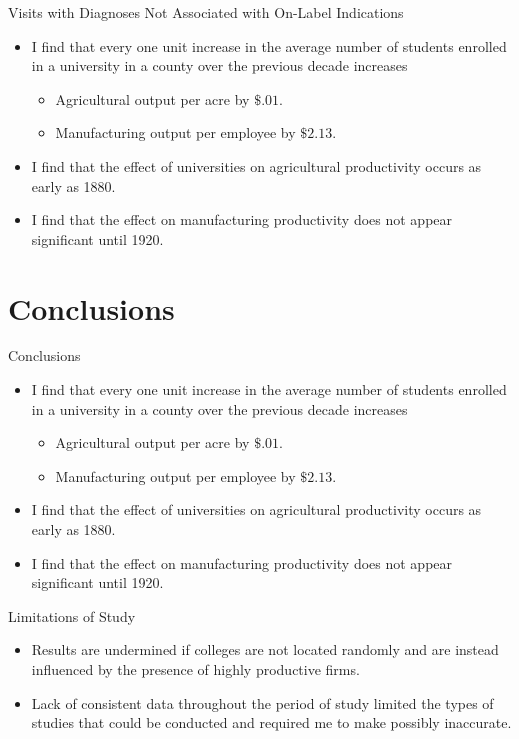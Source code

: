 \documentclass{beamer}
\begin{document}
\begin{frame}{Visits with Diagnoses Not Associated with On-Label Indications}
\begin{itemize}
\item I find that every one unit increase in the average number of students enrolled in a university in a county over the previous decade increases 
\begin{itemize}
\item Agricultural output per acre by $\$.01$. 
\item Manufacturing output per employee by $\$2.13$.
\end{itemize}
\item I find that the effect of universities on agricultural productivity occurs as early as 1880.
\item I find that the effect on manufacturing productivity does not appear significant until 1920.
\end{itemize}
\end{frame}

\section{Conclusions}
\begin{frame}{Conclusions}
\begin{itemize}
\item I find that every one unit increase in the average number of students enrolled in a university in a county over the previous decade increases 
\begin{itemize}
\item Agricultural output per acre by $\$.01$. 
\item Manufacturing output per employee by $\$2.13$.
\end{itemize}
\item I find that the effect of universities on agricultural productivity occurs as early as 1880.
\item I find that the effect on manufacturing productivity does not appear significant until 1920.
\end{itemize}
\end{frame}

\begin{frame}{Limitations of Study}
\begin{itemize}
\item Results are undermined if colleges are not located randomly and are instead influenced by the presence of highly productive firms.
\item Lack of consistent data throughout the period of study limited the types of studies that could be conducted and required me to make possibly inaccurate.
\end{itemize}
\end{frame}
\end{document}
